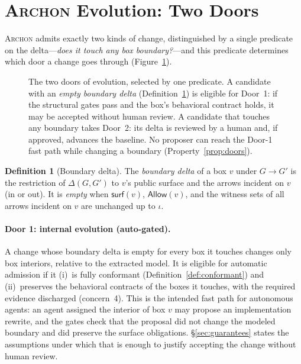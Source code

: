 \documentclass[sigconf,review,anonymous]{acmart}
\theoremstyle{plain}
\theoremstyle{definition}
\newtheorem{definition}[theorem]{Definition}
\begin{document}
\section{\textsc{Archon} Evolution: Two Doors}\label{sec:evolve}

\textsc{Archon} admits exactly two kinds of change, distinguished by a single
predicate on the delta---\emph{does it touch any box boundary?}---and this
predicate determines which door a change goes through
(Figure~\ref{fig:doors}).

\begin{figure}[t]
\centering

\caption{The two doors of evolution, selected by one predicate. A candidate
with an \emph{empty boundary delta} (Definition~\ref{def:bdelta}) is eligible
for Door~1: if the structural gates pass and the box's behavioral contract
holds, it may be accepted without human review. A candidate that touches any
boundary takes Door~2: its delta is reviewed by a human and, if approved,
advances the baseline. No proposer can reach the Door-1 fast path while
changing a boundary (Property~\ref{prop:doors}).}
\label{fig:doors}
\end{figure}

\begin{definition}[Boundary delta]\label{def:bdelta}
The \emph{boundary delta} of a box $v$ under $G \to G'$ is the restriction of
$\Delta(G,G')$ to $v$'s public surface and the arrows incident on $v$ (in or
out). It is \emph{empty} when $\mathsf{surf}(v)$, $\mathsf{Allow}(v)$, and the
witness sets of all arrows incident on $v$ are unchanged up to $\iota$.
\end{definition}

\paragraph{Door 1: internal evolution (auto-gated).}
A change whose boundary delta is empty for every box it touches changes only
box interiors, relative to the extracted model. It is eligible for automatic
admission if it (i)~is fully conformant (Definition~\ref{def:conformant}) and
(ii)~preserves the behavioral contracts of the boxes it touches, with the
required evidence discharged (concern~4).
This is the intended fast path for autonomous agents: an agent assigned the
interior of box $v$ may propose an implementation rewrite, and the gates check
that the proposal did not change the modeled boundary and did preserve the
surface obligations. \S\ref{sec:guarantees} states the assumptions under which
that is enough to justify accepting the change without human review.
\end{document}
